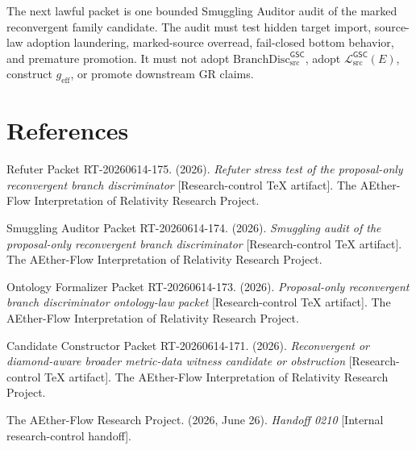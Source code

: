 \documentclass[11pt]{article}
\newcommand{\MetricData}{\mathcal{L}_{\mathrm{src}}^{\mathsf{GSC}}}
\newcommand{\geff}{g_{\mathrm{eff}}}
\newcommand{\BranchDisc}{\mathrm{BranchDisc}_{\mathrm{src}}^{\mathsf{GSC}}}
\begin{document}
The next lawful packet is one bounded Smuggling Auditor audit of the marked
reconvergent family candidate. The audit must test hidden target import,
source-law adoption laundering, marked-source overread, fail-closed bottom
behavior, and premature promotion. It must not adopt \(\BranchDisc\), adopt
\(\MetricData(E)\), construct \(\geff\), or promote downstream GR claims.

\section*{References}

Refuter Packet RT-20260614-175. (2026). \textit{Refuter stress test of the
proposal-only reconvergent branch discriminator} [Research-control TeX
artifact]. The AEther-Flow Interpretation of Relativity Research Project.

Smuggling Auditor Packet RT-20260614-174. (2026). \textit{Smuggling audit of
the proposal-only reconvergent branch discriminator} [Research-control TeX
artifact]. The AEther-Flow Interpretation of Relativity Research Project.

Ontology Formalizer Packet RT-20260614-173. (2026). \textit{Proposal-only
reconvergent branch discriminator ontology-law packet} [Research-control TeX
artifact]. The AEther-Flow Interpretation of Relativity Research Project.

Candidate Constructor Packet RT-20260614-171. (2026). \textit{Reconvergent or
diamond-aware broader metric-data witness candidate or obstruction}
[Research-control TeX artifact]. The AEther-Flow Interpretation of Relativity
Research Project.

The AEther-Flow Research Project. (2026, June 26). \textit{Handoff 0210}
[Internal research-control handoff].
\end{document}
